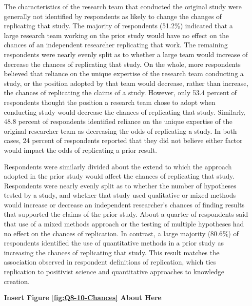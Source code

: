 \documentclass[]{interact}
\theoremstyle{plain}%
\theoremstyle{definition}
\theoremstyle{remark}
\begin{document}
The characteristics of the research team that conducted the original study were generally not identified by respondents as likely to change the changes of replicating that study. 
The majority of respondents (51.2\%) indicated that a large research team working on the prior study would have no effect on the chances of an independent researcher replicating that work. 
The remaining respondents were nearly evenly split as to whether a large team would increase of decrease the chances of replicating that study. 
On the whole, more respondents believed that reliance on the unique expertise of the research team conducting a study, or the position adopted by that team would decrease, rather than increase, the chances of replicating the claims of a study.
However, only 53.4 percent of respondents thought the position a research team chose to adopt when conducting study would decrease the chances of replicating that study. 
Similarly, 48.8 percent of respondents identified reliance on the unique expertise of the original researcher team as decreasing the odds of replicating a study. 
In both cases, 24 percent of respondents reported that they did not believe either factor would impact the odds of replicating a prior result.

Respondents were similarly divided about the extend to which the approach adopted in the prior study would affect the chances of replicating that study. 
Respondents were nearly evenly split as to whether the number of hypotheses tested by a study, and whether that study used qualitative or mixed methods would increase or decrease an independent researcher's chances of finding results that supported the claims of the prior study.
About a quarter of respondents said that use of a mixed methods approach or the testing of multiple hypotheses had no effect on the chances of replication.
In contrast, a large majority (80.6\%) of respondents identified the use of quantitative methods in a prior study as increasing the chances of replicating that study. 
This result matches the association observed in respondent definitions of replication, which ties replication to positivist science and quantitative approaches to knowledge creation.   

\begin{center}
\textbf{Insert Figure \ref{fig:Q8-10-Chances} About Here}
\end{center}
\end{document}
